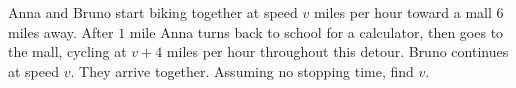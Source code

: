 Anna and Bruno start biking together at speed $v$ miles per hour toward a mall $6$ miles away. After $1$ mile Anna turns back to school for a calculator, then goes to the mall, cycling at $v+4$ miles per hour throughout this detour. Bruno continues at speed $v$. They arrive together. Assuming no stopping time, find $v$.
